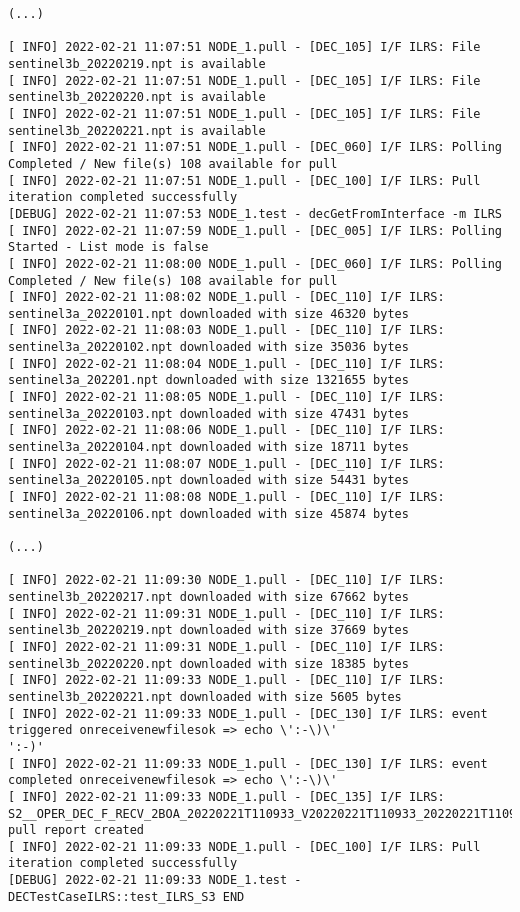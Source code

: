 \documentclass[dec_sum_main.tex]{subfiles}
\begin{document}
\begin{Verbatim}[fontsize=\tiny]
(...)

[ INFO] 2022-02-21 11:07:51 NODE_1.pull - [DEC_105] I/F ILRS: File sentinel3b_20220219.npt is available
[ INFO] 2022-02-21 11:07:51 NODE_1.pull - [DEC_105] I/F ILRS: File sentinel3b_20220220.npt is available
[ INFO] 2022-02-21 11:07:51 NODE_1.pull - [DEC_105] I/F ILRS: File sentinel3b_20220221.npt is available
[ INFO] 2022-02-21 11:07:51 NODE_1.pull - [DEC_060] I/F ILRS: Polling Completed / New file(s) 108 available for pull
[ INFO] 2022-02-21 11:07:51 NODE_1.pull - [DEC_100] I/F ILRS: Pull iteration completed successfully
[DEBUG] 2022-02-21 11:07:53 NODE_1.test - decGetFromInterface -m ILRS
[ INFO] 2022-02-21 11:07:59 NODE_1.pull - [DEC_005] I/F ILRS: Polling Started - List mode is false
[ INFO] 2022-02-21 11:08:00 NODE_1.pull - [DEC_060] I/F ILRS: Polling Completed / New file(s) 108 available for pull
[ INFO] 2022-02-21 11:08:02 NODE_1.pull - [DEC_110] I/F ILRS: sentinel3a_20220101.npt downloaded with size 46320 bytes
[ INFO] 2022-02-21 11:08:03 NODE_1.pull - [DEC_110] I/F ILRS: sentinel3a_20220102.npt downloaded with size 35036 bytes
[ INFO] 2022-02-21 11:08:04 NODE_1.pull - [DEC_110] I/F ILRS: sentinel3a_202201.npt downloaded with size 1321655 bytes
[ INFO] 2022-02-21 11:08:05 NODE_1.pull - [DEC_110] I/F ILRS: sentinel3a_20220103.npt downloaded with size 47431 bytes
[ INFO] 2022-02-21 11:08:06 NODE_1.pull - [DEC_110] I/F ILRS: sentinel3a_20220104.npt downloaded with size 18711 bytes
[ INFO] 2022-02-21 11:08:07 NODE_1.pull - [DEC_110] I/F ILRS: sentinel3a_20220105.npt downloaded with size 54431 bytes
[ INFO] 2022-02-21 11:08:08 NODE_1.pull - [DEC_110] I/F ILRS: sentinel3a_20220106.npt downloaded with size 45874 bytes

(...)

[ INFO] 2022-02-21 11:09:30 NODE_1.pull - [DEC_110] I/F ILRS: sentinel3b_20220217.npt downloaded with size 67662 bytes
[ INFO] 2022-02-21 11:09:31 NODE_1.pull - [DEC_110] I/F ILRS: sentinel3b_20220219.npt downloaded with size 37669 bytes
[ INFO] 2022-02-21 11:09:31 NODE_1.pull - [DEC_110] I/F ILRS: sentinel3b_20220220.npt downloaded with size 18385 bytes
[ INFO] 2022-02-21 11:09:33 NODE_1.pull - [DEC_110] I/F ILRS: sentinel3b_20220221.npt downloaded with size 5605 bytes
[ INFO] 2022-02-21 11:09:33 NODE_1.pull - [DEC_130] I/F ILRS: event triggered onreceivenewfilesok => echo \':-\)\'
':-)'
[ INFO] 2022-02-21 11:09:33 NODE_1.pull - [DEC_130] I/F ILRS: event completed onreceivenewfilesok => echo \':-\)\'
[ INFO] 2022-02-21 11:09:33 NODE_1.pull - [DEC_135] I/F ILRS: S2__OPER_DEC_F_RECV_2BOA_20220221T110933_V20220221T110933_20220221T110933_ILRS.xml pull report created
[ INFO] 2022-02-21 11:09:33 NODE_1.pull - [DEC_100] I/F ILRS: Pull iteration completed successfully
[DEBUG] 2022-02-21 11:09:33 NODE_1.test - DECTestCaseILRS::test_ILRS_S3 END
	\end{Verbatim}
\end{document}
